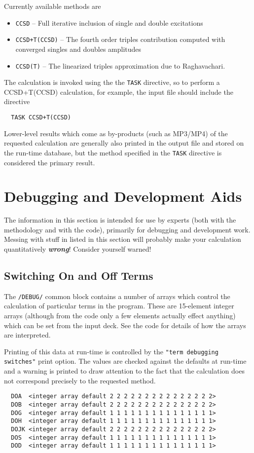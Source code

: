 Currently available methods are
\begin{itemize}
\item \verb+CCSD+ -- Full iterative inclusion of single and double
excitations
\item \verb=CCSD+T(CCSD)= -- The fourth order triples contribution computed with
converged singles and doubles amplitudes
\item \verb=CCSD(T)= -- The linearized triples approximation due to
  Raghavachari.
\end{itemize}

The calculation is invoked using the the \verb+TASK+ directive, so to
perform a CCSD+T(CCSD) calculation, for example, the input file should
include the directive
\begin{verbatim}
  TASK CCSD+T(CCSD)
\end{verbatim}

Lower-level results which come as by-products (such as MP3/MP4) of the
requested calculation are generally also printed in the output file
and stored on the run-time database, but the method specified in the
\verb+TASK+ directive is considered the primary result.

\section{Debugging and Development Aids}

The information in this section is intended for use by experts (both
with the methodology and with the code), primarily for debugging and
development work.  Messing with stuff in listed in this section will
probably make your calculation quantitatively {\em\bf wrong}\/!
Consider yourself warned!

\subsection{Switching On and Off Terms}

The \verb+/DEBUG/+ common block contains a number of arrays which
control the calculation of particular terms in the program.  These are
15-element integer arrays (although from the code only a few elements
actually effect anything) which can be set from the input deck.  See
the code for details of how the arrays are interpreted.  

Printing of this data at run-time is controlled by the
\verb+"term debugging switches"+ print option.  The values are checked against
the defaults at run-time and a warning is printed to draw attention to
the fact that the calculation does not correspond precisely to the
requested method.

\begin{verbatim}
  DOA  <integer array default 2 2 2 2 2 2 2 2 2 2 2 2 2 2 2>
  DOB  <integer array default 2 2 2 2 2 2 2 2 2 2 2 2 2 2 2>
  DOG  <integer array default 1 1 1 1 1 1 1 1 1 1 1 1 1 1 1>
  DOH  <integer array default 1 1 1 1 1 1 1 1 1 1 1 1 1 1 1>
  DOJK <integer array default 2 2 2 2 2 2 2 2 2 2 2 2 2 2 2>
  DOS  <integer array default 1 1 1 1 1 1 1 1 1 1 1 1 1 1 1>
  DOD  <integer array default 1 1 1 1 1 1 1 1 1 1 1 1 1 1 1>
\end{verbatim}
